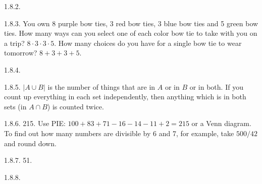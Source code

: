 \begin {itemize}
\begin{ans}{1.8.2.}
\end{ans}
\begin{ans}{1.8.3.}
		You own 8 purple bow ties, 3 red bow ties, 3 blue bow ties and 5 green bow ties.  How many ways can you select one of each color bow tie to take with you on a trip?  $8 \cdot 3 \cdot 3 \cdot 5$.  How many choices do you have for a single bow tie to wear tomorrow?  $8 + 3 + 3 + 5$.
	
\end{ans}
\begin{ans}{1.8.4.}
	
\end{ans}
\begin{ans}{1.8.5.}
		$|A \cup B|$ is the number of things that are in $A$ or in $B$ or in both.  If you count up everything in each set independently, then anything which is in both sets (in $A \cap B$) is counted twice.
	
\end{ans}
\begin{ans}{1.8.6.}
		215.  Use PIE: $100 + 83 + 71 - 16 - 14 -11 + 2 = 215$ or a Venn diagram.  To find out how many numbers are divisible by 6 and 7, for example, take $500/42$ and round down.
	
\end{ans}
\begin{ans}{1.8.7.}
		51.
	
\end{ans}
\begin{ans}{1.8.8.}
		\begin{parts}

\end{parts}
\end{ans}
\end{itemize}
